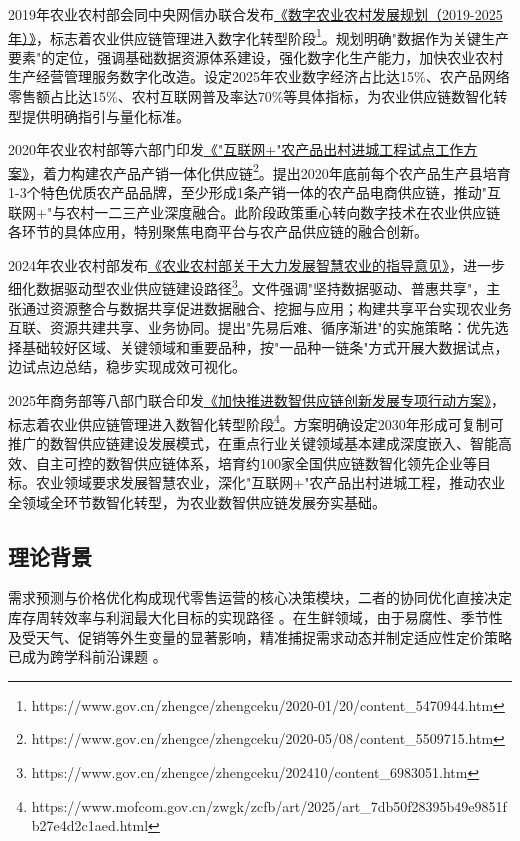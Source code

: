 \documentclass[lang=cn,12pt,a4paper]{elegantpaper}
\begin{document}
2019年农业农村部会同中央网信办联合发布\href{https://www.gov.cn/zhengce/zhengceku/2020-01/20/content_5470944.htm}{《数字农业农村发展规划（2019-2025年）》}，标志着农业供应链管理进入数字化转型阶段\footnote{https://www.gov.cn/zhengce/zhengceku/2020-01/20/content\_5470944.htm}。规划明确"数据作为关键生产要素"的定位，强调基础数据资源体系建设，强化数字化生产能力，加快农业农村生产经营管理服务数字化改造。设定2025年农业数字经济占比达15\%、农产品网络零售额占比达15\%、农村互联网普及率达70\%等具体指标，为农业供应链数智化转型提供明确指引与量化标准。

2020年农业农村部等六部门印发\href{https://www.gov.cn/zhengce/zhengceku/2020-05/08/content_5509715.htm}{《"互联网+"农产品出村进城工程试点工作方案》}，着力构建农产品产销一体化供应链\footnote{https://www.gov.cn/zhengce/zhengceku/2020-05/08/content\_5509715.htm}。提出2020年底前每个农产品生产县培育1-3个特色优质农产品品牌，至少形成1条产销一体的农产品电商供应链，推动"互联网+"与农村一二三产业深度融合。此阶段政策重心转向数字技术在农业供应链各环节的具体应用，特别聚焦电商平台与农产品供应链的融合创新。

2024年农业农村部发布\href{https://www.gov.cn/zhengce/zhengceku/202410/content_6983051.htm}{《农业农村部关于大力发展智慧农业的指导意见》}，进一步细化数据驱动型农业供应链建设路径\footnote{https://www.gov.cn/zhengce/zhengceku/202410/content\_6983051.htm}。文件强调"坚持数据驱动、普惠共享"，主张通过资源整合与数据共享促进数据融合、挖掘与应用；构建共享平台实现农业务互联、资源共建共享、业务协同。提出"先易后难、循序渐进"的实施策略：优先选择基础较好区域、关键领域和重要品种，按"一品种一链条"方式开展大数据试点，边试点边总结，稳步实现成效可视化。

2025年商务部等八部门联合印发\href{https://www.mofcom.gov.cn/zwgk/zcfb/art/2025/art_7db50f28395b49e9851fb27e4d2c1aed.html}{《加快推进数智供应链创新发展专项行动方案》}，标志着农业供应链管理进入数智化转型阶段\footnote{https://www.mofcom.gov.cn/zwgk/zcfb/art/2025/art\_7db50f28395b49e9851fb27e4d2c1aed.html}。方案明确设定2030年形成可复制可推广的数智供应链建设发展模式，在重点行业关键领域基本建成深度嵌入、智能高效、自主可控的数智供应链体系，培育约100家全国供应链数智化领先企业等目标。农业领域要求发展智慧农业，深化"互联网+"农产品出村进城工程，推动农业全领域全环节数智化转型，为农业数智供应链发展夯实基础。
\subsection{理论背景}
\label{subsec:theoretical_background}

需求预测与价格优化构成现代零售运营的核心决策模块，二者的协同优化直接决定库存周转效率与利润最大化目标的实现路径 \citep{Mahapatra2025,Lu2024}。在生鲜领域，由于易腐性、季节性及受天气、促销等外生变量的显著影响，精准捕捉需求动态并制定适应性定价策略已成为跨学科前沿课题 \citep{Badakhshan2024,Hashemi-Amiri2023,Hofmann2018}。
\end{document}
